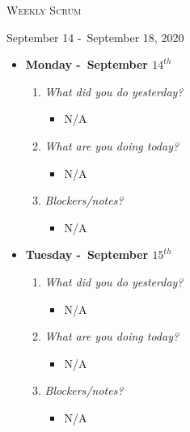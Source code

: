 \centerline{\LARGE\textsc{Weekly Scrum}}
\centerline{September 14 -\ September 18, 2020}
\textbf{}
\begin{itemize}
  \item[] \textbf{\large Monday -\ September \(14^{th}\)}
  \begin{enumerate}
    \item \textsl{What did you do yesterday?}
    \begin{itemize}
      \item N/A
    \end{itemize}
    \item \textsl{What are you doing today?}
    \begin{itemize}
      \item N/A
    \end{itemize}
    \item \textsl{Blockers/notes?}
    \begin{itemize}
      \item N/A
    \end{itemize}
  \end{enumerate}
\end{itemize}
\textbf{}
\begin{itemize}
  \item[] \textbf{\large Tuesday -\ September \(15^{th}\)}
  \begin{enumerate}
    \item \textsl{What did you do yesterday?}
    \begin{itemize}
      \item N/A
    \end{itemize}
    \item \textsl{What are you doing today?}
    \begin{itemize}
      \item N/A
    \end{itemize}
    \item \textsl{Blockers/notes?}
    \begin{itemize}
      \item N/A
    \end{itemize}
  \end{enumerate}
\end{itemize}
\textbf{}
